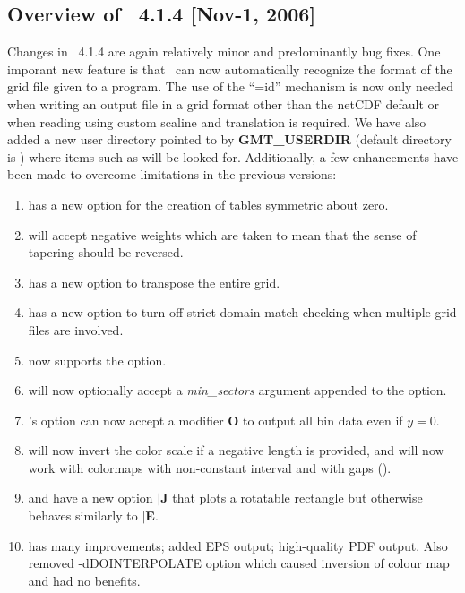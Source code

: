 \subsection{Overview of \gmt\ 4.1.4 [Nov-1, 2006]}

Changes in \GMT\ 4.1.4 are again relatively minor and predominantly bug fixes.  One imporant
new feature is that \GMT\ can now automatically recognize the format of the grid file given
to a program.  The use of the ``=id'' mechanism is now only needed when writing an output file in
a grid format other than the netCDF default or when reading using custom scaline and translation
is required.  We have also added
a new user directory pointed to by {\bf GMT\_USERDIR} (default directory is )
where items such as  will be looked for.  Additionally, a few enhancements
have been made to overcome limitations in the previous versions:

\begin{enumerate}
\item {} has a new option  for the creation of tables symmetric about zero.
\item {} will accept negative weights which are taken to mean that the sense of tapering should be reversed.
\item {} has a new option  to transpose the entire grid.
\item {} has a new option  to turn off strict domain match checking when multiple grid files are involved.
\item {} now supports the  option.
\item {} will now optionally accept a {\it min\_sectors} argument appended to the  option.
\item {}'s option  can now accept a modifier {\bf O} to output all bin data even if $y = 0$.
\item {} will now invert the color scale if a negative length is provided, and
 will now work with colormaps with non-constant interval and with gaps ().
\item {} and  have a new option $|${\bf J} that plots a rotatable
rectangle but otherwise behaves similarly to $|${\bf E}.
\item {} has many improvements; added EPS output; high-quality PDF output.
Also removed -dDOINTERPOLATE option which caused inversion of colour map and had no benefits.
\end{enumerate}

